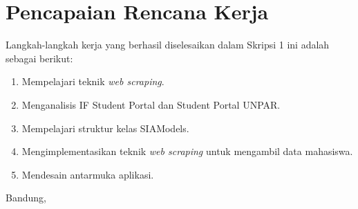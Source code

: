 \documentclass[a4paper,twoside]{article}
\begin{document}
\section{Pencapaian Rencana Kerja}
Langkah-langkah kerja yang berhasil diselesaikan dalam Skripsi 1 ini adalah sebagai berikut:
\begin{enumerate}
\item Mempelajari teknik \textit{web scraping}.
\item Menganalisis IF Student Portal dan Student Portal UNPAR.
\item Mempelajari struktur kelas SIAModels.
\item Mengimplementasikan teknik \textit{web scraping} untuk mengambil data mahasiswa.
\item Mendesain antarmuka aplikasi.
\end{enumerate}




\vspace{1cm}
\centering Bandung, \tanggal\\
\vspace{2cm} \nama \\ 
\vspace{1cm}
\end{document}

